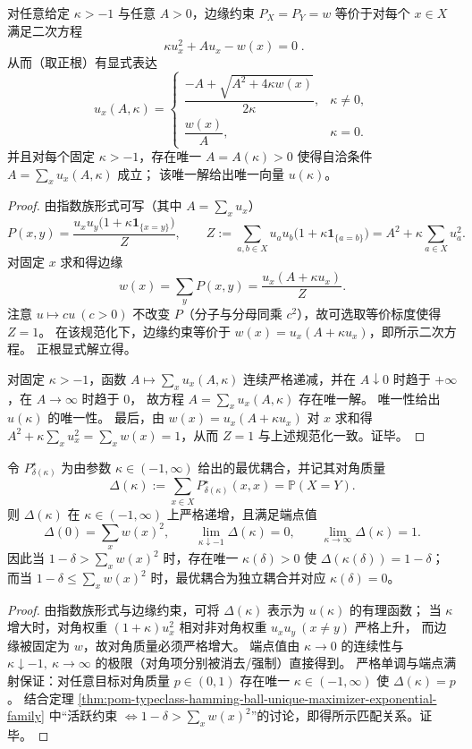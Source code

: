 \begin{theorem}[边缘约束的二次根与自洽方程]\label{thm:pom-typeclass-diagonal-coupling-scalarization}
对任意给定 \(\kappa>-1\) 与任意 \(A>0\)，边缘约束 \(P_X=P_Y=w\) 等价于对每个 \(x\in X\) 满足二次方程
\[
\boxed{\;
\kappa u_x^2+A u_x-w(x)=0\; } .
\]
从而（取正根）有显式表达
\[
u_x(A,\kappa)=
\begin{cases}
\dfrac{-A+\sqrt{A^2+4\kappa w(x)}}{2\kappa}, & \kappa\ne0,\\[10pt]
\dfrac{w(x)}{A}, & \kappa=0.
\end{cases}
\]
并且对每个固定 \(\kappa>-1\)，存在唯一 \(A=A(\kappa)>0\) 使得自洽条件 \(A=\sum_x u_x(A,\kappa)\) 成立；
该唯一解给出唯一向量 \(u(\kappa)\)。
\end{theorem}
\begin{proof}
由指数族形式可写（其中 \(A=\sum_x u_x\)）
\[
P(x,y)=\frac{u_xu_y\bigl(1+\kappa\mathbf 1_{\{x=y\}}\bigr)}{Z},
\qquad
Z:=\sum_{a,b\in X}u_au_b\bigl(1+\kappa\mathbf 1_{\{a=b\}}\bigr)=A^2+\kappa\sum_{a\in X}u_a^2.
\]
对固定 \(x\) 求和得边缘
\[
w(x)=\sum_y P(x,y)=\frac{u_x(A+\kappa u_x)}{Z}.
\]
注意 \(u\mapsto cu\ (c>0)\) 不改变 \(P\)（分子与分母同乘 \(c^2\)），故可选取等价标度使得 \(Z=1\)。
在该规范化下，边缘约束等价于 \(w(x)=u_x(A+\kappa u_x)\)，即所示二次方程。
正根显式解立得。
\par
对固定 \(\kappa>-1\)，函数 \(A\mapsto \sum_x u_x(A,\kappa)\) 连续严格递减，并在 \(A\downarrow 0\) 时趋于 \(+\infty\)，在 \(A\to\infty\) 时趋于 \(0\)，
故方程 \(A=\sum_x u_x(A,\kappa)\) 存在唯一解。
唯一性给出 \(u(\kappa)\) 的唯一性。
最后，由 \(w(x)=u_x(A+\kappa u_x)\) 对 \(x\) 求和得 \(A^2+\kappa\sum_x u_x^2=\sum_x w(x)=1\)，从而 \(Z=1\) 与上述规范化一致。证毕。
\end{proof}

\begin{theorem}[对角质量的严格单调性与唯一匹配]\label{thm:pom-typeclass-diagonal-mass-monotone}
令 \(P^\star_{\delta(\kappa)}\) 为由参数 \(\kappa\in(-1,\infty)\) 给出的最优耦合，并记其对角质量
\[
\Delta(\kappa):=\sum_{x\in X}P^\star_{\delta(\kappa)}(x,x)=\mathbb P(X=Y).
\]
则 \(\Delta(\kappa)\) 在 \(\kappa\in(-1,\infty)\) 上严格递增，且满足端点值
\[
\Delta(0)=\sum_x w(x)^2,\qquad
\lim_{\kappa\downarrow-1}\Delta(\kappa)=0,\qquad
\lim_{\kappa\to\infty}\Delta(\kappa)=1.
\]
因此当 \(1-\delta>\sum_x w(x)^2\) 时，存在唯一 \(\kappa(\delta)>0\) 使 \(\Delta(\kappa(\delta))=1-\delta\)；
而当 \(1-\delta\le \sum_x w(x)^2\) 时，最优耦合为独立耦合并对应 \(\kappa(\delta)=0\)。
\end{theorem}
\begin{proof}
由指数族形式与边缘约束，可将 \(\Delta(\kappa)\) 表示为 \(u(\kappa)\) 的有理函数；
当 \(\kappa\) 增大时，对角权重 \((1+\kappa)u_x^2\) 相对非对角权重 \(u_xu_y\ (x\neq y)\) 严格上升，
而边缘被固定为 \(w\)，故对角质量必须严格增大。
端点值由 \(\kappa\to 0\) 的连续性与 \(\kappa\downarrow-1,\ \kappa\to\infty\) 的极限（对角项分别被消去/强制）直接得到。
严格单调与端点满射保证：对任意目标对角质量 \(p\in(0,1)\) 存在唯一 \(\kappa\in(-1,\infty)\) 使 \(\Delta(\kappa)=p\)。
结合定理 \ref{thm:pom-typeclass-hamming-ball-unique-maximizer-exponential-family} 中“活跃约束 \(\Leftrightarrow 1-\delta>\sum_x w(x)^2\)”的讨论，即得所示匹配关系。证毕。
\end{proof}

